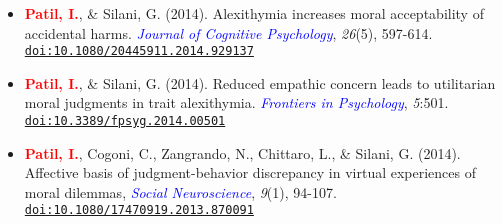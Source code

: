 \documentclass[10pt]{article}
\begin{document}
\begin{itemize}
	\item \textbf{\textcolor{red}{Patil, I.}}, \& Silani, G. (2014). Alexithymia increases moral acceptability of accidental harms. \textit{\textcolor{blue}{Journal of Cognitive Psychology}}, \textit{26}(5), 597-614. \href{https://drive.google.com/file/d/0B6_u70YpdJKnMU5pVHRUM3p0SFk/view?usp=sharing}{\tt doi:10.1080/20445911.2014.929137}
	
	\item \textbf{\textcolor{red}{Patil, I.}}, \& Silani, G. (2014). Reduced empathic concern leads to utilitarian moral judgments in trait alexithymia. \textit{\textcolor{blue}{Frontiers in Psychology}}, \textit{5}:501. \href{https://drive.google.com/file/d/0B6_u70YpdJKnUkJZR252dXBwcVk/view?usp=sharing}{\tt doi:10.3389/fpsyg.2014.00501}
	
	\item \textbf{\textcolor{red}{Patil, I.}}, Cogoni, C., Zangrando, N., Chittaro, L., \& Silani, G. (2014). {Affective basis of judgment-behavior discrepancy in virtual experiences of moral dilemmas}, \textit{\textcolor{blue}{Social Neuroscience}}, \textit{9}(1), 94-107. \\
	\href{https://drive.google.com/file/d/0B6_u70YpdJKnV3RIR2s2cWlFdVU/view?usp=sharing}{\tt doi:10.1080/17470919.2013.870091}
	
	\end{itemize}
	
%	
%	

	
%	
%	
%	
%	
%	
%	
	
\end{document}
